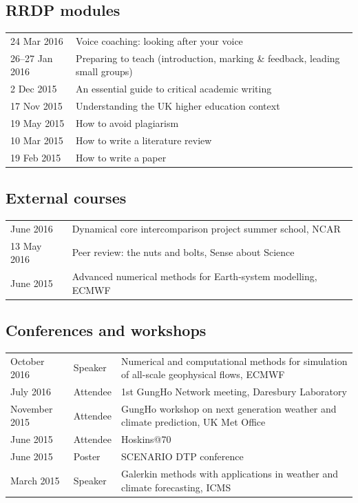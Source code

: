 \documentclass[a4paper,11pt]{article}
\begin{document}
\subsection*{RRDP modules}
\begin{tabular}{l l}
24 Mar 2016	& Voice coaching: looking after your voice \\
26--27 Jan 2016 & Preparing to teach (introduction, marking \& feedback, leading small groups) \\
2 Dec 2015	& An essential guide to critical academic writing \\
17 Nov 2015	& Understanding the UK higher education context \\
19 May 2015	& How to avoid plagiarism \\
10 Mar 2015	& How to write a literature review \\
19 Feb 2015	& How to write a paper \\
\end{tabular}

\subsection*{External courses}
\begin{tabular}{l l}
June 2016 & Dynamical core intercomparison project summer school, NCAR \\
13 May 2016 & Peer review: the nuts and bolts, Sense about Science \\
June 2015 & Advanced numerical methods for Earth-system modelling, ECMWF \\
\end{tabular}

\subsection*{Conferences and workshops}
\begin{tabularx}{\linewidth}{l l X}
October 2016 & Speaker & Numerical and computational methods for simulation of all-scale geophysical flows, ECMWF \\
July 2016 & Attendee & 1st GungHo Network meeting, Daresbury Laboratory \\
November 2015 & Attendee & GungHo workshop on next generation weather and climate prediction, UK Met Office \\
June 2015 & Attendee & Hoskins@70 \\
June 2015 & Poster & SCENARIO DTP conference \\
March 2015 & Speaker & Galerkin methods with applications in weather and climate forecasting, ICMS \\
\end{tabularx}
\end{document}
